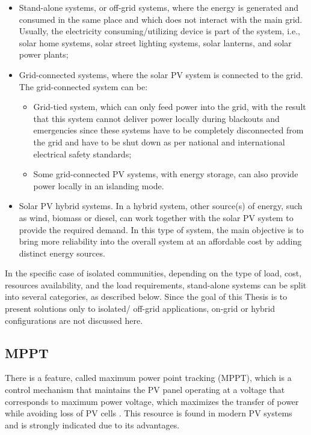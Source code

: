 \begin{itemize}
\item Stand-alone systems, or off-grid systems, where the energy is generated and consumed in the same place and which does not interact with the main grid. Usually, the electricity consuming/utilizing device is part of the system, i.e., solar home systems, solar street lighting systems, solar lanterns, and solar power plants; 
\item Grid-connected systems, where the solar PV system is connected to the grid. The grid-connected system can be: 
\begin{itemize}
\item Grid-tied system, which can only feed power into the grid, with the result that this system cannot deliver power locally during blackouts and emergencies since these systems have to be completely disconnected from the grid and have to be shut down as per national and international electrical safety standards;
\item Some grid-connected PV systems, with energy storage, can also provide power locally in an islanding mode. 
\end{itemize}
\item Solar PV hybrid systems. In a hybrid system, other source(s) of energy, such as wind, biomass or diesel, can work together with the solar PV system to provide the required demand. In this type of system, the main objective is to bring more reliability into the overall system at an affordable cost by adding distinct energy sources.
\end{itemize}
 
In the specific case of isolated communities, depending on the type of load, cost, resources availability, and the load requirements, stand-alone systems can be split into several categories, as described below. Since the goal of this Thesis is to present solutions only to isolated/ off-grid applications, on-grid or hybrid configurations are not discussed here.

\subsection{MPPT} 

There is a feature, called maximum power point tracking (MPPT), which is a control mechanism that maintains the PV panel operating at a voltage that corresponds to maximum power voltage, which maximizes the transfer of power while avoiding loss of PV cells \cite{Pinho}. This resource is found in modern PV systems and is strongly indicated due to its advantages.

